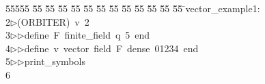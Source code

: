 %
%
\begin{tabbing}
55555 \= 55 \= 55 \= 55 \= 55 \= 55 \= 55 \= 55 \= 55 \= 55 \= 55 \= 55 \= 55 \= \>vector\_example1:\\[0pt]
2\>$\triangleright$\>(ORBITER)\ v\ 2\ \\[0pt]
3\>$\triangleright$\>$\triangleright$\>define\ F\ finite\_field\ q\ 5\ end\ \\[0pt]
4\>$\triangleright$\>$\triangleright$\>define\ v\ vector\ field\ F\ dense\ 01234\ end\ \\[0pt]
5\>$\triangleright$\>$\triangleright$\>print\_symbols\\[0pt]
6\>\end{tabbing}
